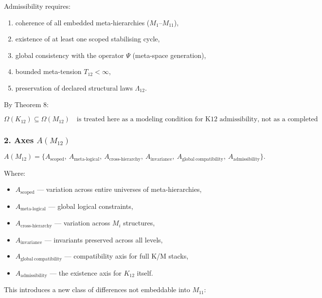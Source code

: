 Admissibility requires:

\begin{enumerate}
    \item coherence of all embedded meta-hierarchies (\(M_1\)–\(M_{11}\)),
    \item existence of at least one scoped stabilising cycle,
    \item global consistency with the operator $\Psi$ (meta-space generation),
    \item bounded meta-tension $T_{12}<\infty$,
    \item preservation of declared structural laws $\Lambda_{12}$.
\end{enumerate}

By Theorem 8:

\[
\Omega(K_{12}) \subseteq \Omega(M_{12})\quad \text{is treated here as a modeling condition for K12 admissibility, not as a completed necessary-and-sufficient theorem.}
\]

\subsubsection*{2. Axes $A(M_{12})$}

\[
A(M_{12}) =
\{
A_{\mathrm{scoped}},\
A_{\mathrm{meta\mbox{-}logical}},\
A_{\mathrm{cross\mbox{-}hierarchy}},\
A_{\mathrm{invariance}},\
A_{\mathrm{global\ compatibility}},\
A_{\mathrm{admissibility}}
\}.
\]

Where:

\begin{itemize}
    \item $A_{\mathrm{scoped}}$ — variation across entire universes of meta-hierarchies,
    \item $A_{\mathrm{meta\mbox{-}logical}}$ — global logical constraints,
    \item $A_{\mathrm{cross\mbox{-}hierarchy}}$ — variation across $M_i$ structures,
    \item $A_{\mathrm{invariance}}$ — invariants preserved across all levels,
    \item $A_{\mathrm{global\ compatibility}}$ — compatibility axis for full K/M stacks,
    \item $A_{\mathrm{admissibility}}$ — the existence axis for $K_{12}$ itself.
\end{itemize}

This introduces a new class of differences not embeddable into $M_{11}$:

